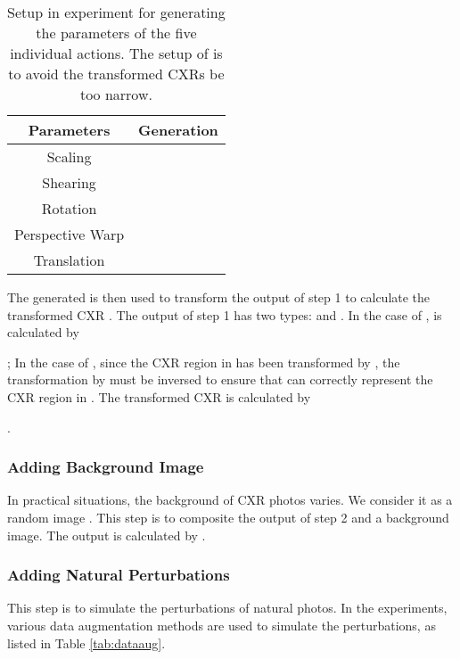 \documentclass[preprint, 12pt]{elsarticle}
\begin{document}
\begin{table}
    \centering
    \footnotesize
    \begin{tabular}{|c|c|}
        \hline
        \textbf{Parameters} & \textbf{Generation} \\
        \hline
        Scaling & \\
        \hline
        Shearing & \\
        \hline
        Rotation & \\
        \hline
        Perspective Warp & \\
        \hline
        Translation & \\
        \hline
    \end{tabular}
    \caption{Setup in experiment for generating the parameters of the five individual actions. The setup of is to avoid the transformed CXRs be too narrow.}
    \label{tab:params}
\end{table}

The generated  is then used to transform the output of step 1 to calculate the transformed CXR . The output of step 1 has two types:  and . In the case of ,  is calculated by

; In the case of , since the CXR region in  has been transformed by , the transformation by  must be inversed to ensure that  can correctly represent the CXR region in . The transformed CXR  is calculated by

.

\subsubsection{Adding Background Image}

In practical situations, the background of CXR photos varies. We consider it as a random image . This step is to composite the output  of step 2 and a background image. The output  is calculated by .

\subsubsection{Adding Natural Perturbations}

This step is to simulate the perturbations of natural photos. In the experiments, various data augmentation methods are used to simulate the perturbations, as listed in Table \ref{tab:dataaug}.
\end{document}
